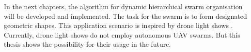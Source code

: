In the next chapters, the algorithm for dynamic hierarchical swarm organisation
will be developed and implemented.
The task for the swarm is to form designated geometric shapes.
This application scenario is inspired by drone light shows \parencite{VergeAero}.
Currently, drone light shows do not employ autonomous UAV swarms.
But this thesis shows the possibility for their usage in the future.